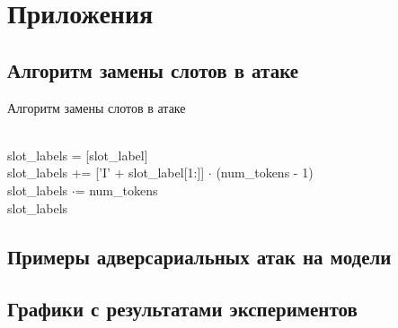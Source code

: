 \section*{Приложения}


\renewcommand{\thesubsection}{\Alph{subsection}}

\subsection{Алгоритм замены слотов в атаке}

\begin{algorithm}
    \caption{Алгоритм замены слотов в атаке}
    \begin{algorithmic}
            \\
            \ind slot\_labels = [slot\_label]
            \ind{}
                    \ind\ind{}
                                \\
                                \ind\ind\ind slot\_labels += ['I' + slot\_label[1:]] $\cdot$ (num\_tokens - 1)
                    \Else
                                \\
                                \ind\ind\ind slot\_labels $\cdot$= num\_tokens
                    \EndIf
            \EndIf \\
            \ind\Return slot\_labels
        \EndFunction
    \end{algorithmic}\label{alg:algorithm3}
\end{algorithm}

\newpage

\subsection{Примеры адверсариальных атак на модели}\label{subsec:examples}




\newpage

\subsection{Графики с результатами экспериментов}\label{subsec:graphs}

